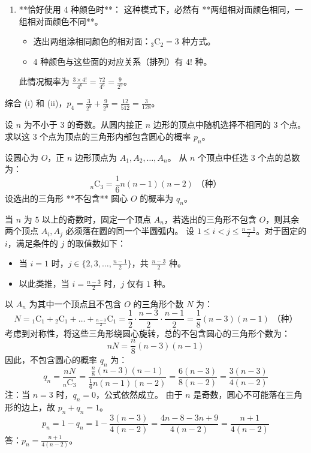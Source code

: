 \begin{questions}
\begin{parts}
\begin{solution}
\begin{enumerate}
            \item **恰好使用 4 种颜色时**：
            这种模式下，必然有 **两组相对面颜色相同，一组相对面颜色不同**。
            \begin{itemize}
                \item 选出两组涂相同颜色的相对面：${}_3\mathrm{C}_2 = 3$ 种方式。
                \item 4 种颜色与这些面的对应关系（排列）有 $4!$ 种。
            \end{itemize}
            此情况概率为 $\frac{3 \times 4!}{4^6} = \frac{72}{4^6} = \frac{9}{2^9}$。
        \end{enumerate}
        综合 (i) 和 (ii)，$p_4 = \frac{3}{2^9} + \frac{9}{2^9} = \frac{12}{512} = \frac{3}{128}$。
    \end{solution}
\end{parts}

\question
设 $n$ 为不小于 $3$ 的奇数。从圆内接正 $n$ 边形的顶点中随机选择不相同的 $3$ 个点。求以这 $3$ 个点为顶点的三角形内部包含圆心的概率 $p_n$。

\begin{solution}
    设圆心为 $O$，正 $n$ 边形顶点为 $A_1, A_2, \dots, A_n$。
    从 $n$ 个顶点中任选 $3$ 个点的总数为：
    \[ {}_n\mathrm{C}_3 = \frac{1}{6}n(n-1)(n-2) \text{ （种）} \]
    设选出的三角形 **不包含** 圆心 $O$ 的概率为 $q_n$。
    
        
    当 $n$ 为 $5$ 以上的奇数时，固定一个顶点 $A_n$，若选出的三角形不包含 $O$，则其余两个顶点 $A_i, A_j$ 必须落在圆的同一个半圆弧内。
    设 $1 \le i < j \le \frac{n-1}{2}$。对于固定的 $i$，满足条件的 $j$ 的取值数如下：
    \begin{itemize}
        \item 当 $i=1$ 时，$j \in \{2, 3, \dots, \frac{n-1}{2}\}$，共 $\frac{n-3}{2}$ 种。
        \item 以此类推，当 $i = \frac{n-3}{2}$ 时，$j$ 仅有 $1$ 种。
    \end{itemize}
    以 $A_n$ 为其中一个顶点且不包含 $O$ 的三角形个数 $N$ 为：
    \[ N = {}_1\mathrm{C}_1 + {}_2\mathrm{C}_1 + \dots + {}_{\frac{n-3}{2}}\mathrm{C}_1 = \frac{1}{2} \cdot \frac{n-3}{2} \cdot \frac{n-1}{2} = \frac{1}{8}(n-3)(n-1) \text{ （种）} \]
    考虑到对称性，将这些三角形绕圆心旋转，总的不包含圆心的三角形个数为：
    \[ nN = \frac{n}{8}(n-3)(n-1)  \]
    因此，不包含圆心的概率 $q_n$ 为：
    \[ q_n = \frac{nN}{{}_n\mathrm{C}_3} = \frac{\frac{n}{8}(n-3)(n-1)}{\frac{1}{6}n(n-1)(n-2)} = \frac{6(n-3)}{8(n-2)} = \frac{3(n-3)}{4(n-2)}  \]
    注：当 $n=3$ 时，$q_n=0$，公式依然成立。
    由于 $n$ 是奇数，圆心不可能落在三角形的边上，故 $p_n + q_n = 1$。
    \[ p_n = 1 - q_n = 1 - \frac{3(n-3)}{4(n-2)} = \frac{4n-8-3n+9}{4(n-2)} = \frac{n+1}{4(n-2)}  \]
    答：$p_n = \frac{n+1}{4(n-2)}$。
\end{solution}


\end{questions}
